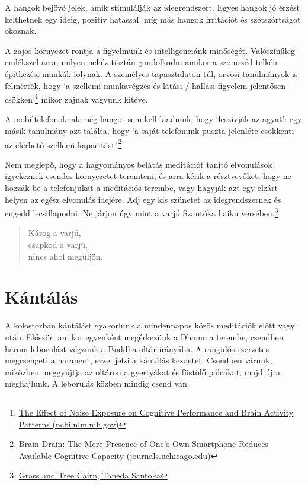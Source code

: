 A hangok bejövő jelek, amik stimulálják az idegrendszert. Egyes hangok
jó érzést kelthetnek egy ideig, pozitív hatással, míg más hangok
irritációt és szétszórtságot okoznak.

A zajos környezet rontja a figyelmünk és intelligenciánk minőségét.
Valószínűleg emlékszel arra, milyen nehéz tisztán gondolkodni amikor a
szomszéd telkén építkezési munkák folynak. A személyes tapasztalaton
túl, orvosi tanulmányok is felmérték, hogy `a szellemi munkavégzés és
látási / hallási figyelem jelentősen csökken'\footnote{\href{https://www.ncbi.nlm.nih.gov/pmc/articles/PMC6901841/}{The
  Effect of Noise Exposure on Cognitive Performance and Brain Activity
  Patterns (ncbi.nlm.nih.gov)}} mikor zajnak vagyunk kitéve.

A mobiltelefonoknak még hangot sem kell kiadniuk, hogy `leszívják az
agyat': egy másik tanulmány azt találta, hogy `a saját telefonunk puszta
jelenléte csökkenti az elérhető szellemi kapacitást'.\footnote{\href{https://www.journals.uchicago.edu/doi/10.1086/691462}{Brain
  Drain: The Mere Presence of One's Own Smartphone Reduces Available
  Cognitive Capacity (journals.uchicago.edu)}}

Nem meglepő, hogy a hagyományos belátás meditációt tanító elvonulások
igyekeznek csendes környezetet teremteni, és arra kérik a résztvevőket,
hogy ne hozzák be a telefonjukat a meditációs terembe, vagy hagyják azt
egy elzárt helyen az egész elvonulás idejére. Adj egy kis szünetet az
idegrendszernek és engedd lecsillapodni. Ne járjon úgy mint a varjú
Szantóka haiku versében,\footnote{\href{https://www.goodreads.com/book/show/931086.Grass_and_Tree_Cairn}{Grass
  and Tree Cairn, Taneda Santoka}}

\begin{quote}
Károg a varjú,\\
csapkod a varjú,\\
nincs ahol megüljön.
\end{quote}

\section{Kántálás}


\noindent A kolostorban kántálást gyakorlunk a mindennapos közös
meditációk előtt vagy után. Először, amikor egyenként megérkezünk a
Dhamma terembe, csendben három leborulást végzünk a Buddha oltár
irányába. A rangidős szerzetes megcsengeti a harangot, ezzel jelzi a
kántálás kezdetét. Csendben várunk, miközben meggyújtja az oltáron a
gyertyákat és füstölő pálcákat, majd újra meghajlunk. A leborulás közben
mindig csend van.

